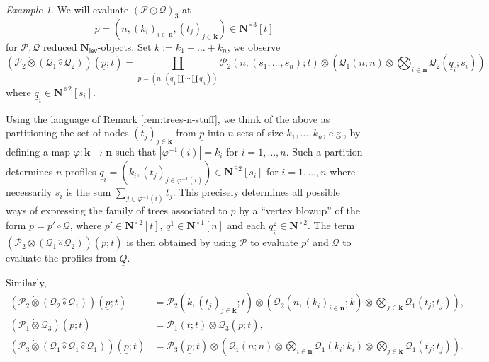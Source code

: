 \documentclass[11pt]{amsart}
\theoremstyle{definition}
\theoremstyle{remark}
\newtheorem{example}[subsection]{Example}
\newcommand{\Cal}[1]{\mathcal{#1}}
\newcommand{\Ncirc}[1]{\mathbf{N}^{\hat{\circ}#1}}
\newcommand{\circhat}{\hat{\circ}}
\newcommand{\circdot}{{\odot}}
\newcommand{\tensordot}{\dot{\otimes}}
\newcommand{\Nl}{\mathbf{N}_{\mathsf{lev}}}
\begin{document}
\begin{example} 
We will evaluate $(\Cal{P}\circdot\Cal{Q})_3$ at \[\underline{p}=(n, (k_i)_{i\in \mathbf{n}}, (t_j)_{j\in \mathbf{k}})\in\Ncirc{3}[t]\] for $\Cal{P}, \Cal{Q}$ reduced $\Nl$-objects. Set $k:=k_1+\dots+k_n$, we observe \[ \left(\Cal{P}_2\tensordot(\Cal{Q}_1\hat{\circ}\Cal{Q}_2) \right)(\underline{p};t)=
\coprod_{\underline{p}=(n,(\underline{q}_1\amalg \cdots \amalg \underline{q}_n))} \Cal{P}_2(n, (s_1,\dots,s_n); t)\otimes \left( \Cal{Q}_1(n;n)\otimes \bigotimes_{i\in\mathbf{n}} \Cal{Q}_2 (\underline{q}_i;s_i)\right)\]
where  $\underline{q}_i\in \Ncirc{2}[s_i]$. 

Using the language of Remark \ref{rem:trees-n-stuff}, we think of the above as partitioning the set of nodes $(t_j)_{j\in\mathbf{k}}$ from $\underline{p}$ into $n$ sets of size $k_1,\dots,k_n$, e.g., by defining a map $\varphi\colon \mathbf{k}\to\mathbf{n}$ such that $|\varphi^{-1}(i)|=k_i$ for $i=1,\dots,n$. Such a partition determines $n$ profiles $\underline{q}_i=(k_i,(t_j)_{j\in\varphi^{-1}(i)}) \in \Ncirc{2}[s_i]$ for $i=1,\dots,n$ where necessarily $s_i$ is the sum $\sum_{j\in \varphi^{-1}(i)} t_j$. This precisely determines all possible ways of expressing the family of trees associated to $\underline{p}$ by a ``vertex blowup'' of the form $\underline{p}=\underline{p}'\circ \Cal{Q}$, where $\underline{p}'\in \Ncirc{2}[t]$, $\underline{q}^1\in \Ncirc{1}[n]$ and each $\underline{q}^2_i\in \Ncirc{2}$. The term $\left(\Cal{P}_2\tensordot(\Cal{Q}_1\hat{\circ}\Cal{Q}_2) \right)(\underline{p};t)$ is then obtained by using $\Cal{P}$ to evaluate $\underline{p}'$ and $\Cal{Q}$ to evaluate the profiles from $\underline{Q}$. %


Similarly, \begin{align*}  
(\Cal{P}_2\tensordot (\Cal{Q}_2 \circhat \Cal{Q}_1))(\underline{p};t) &
=\Cal{P}_2 \left(k, (t_j)_{j\in\mathbf{k}};t\right)\otimes \left( \mathcal{Q}_2(n, (k_i)_{i\in \mathbf{n}}; k) \otimes \bigotimes_{j\in\mathbf{k}} \Cal{Q}_1(t_j;t_j) \right), 
 \\
(\Cal{P}_1\tensordot \Cal{Q}_3)(\underline{p};t) & = \Cal{P}_1(t;t)\otimes \Cal{Q}_3(\underline{p};t),
 \\
(\Cal{P}_3\tensordot(\Cal{Q}_1\circhat\Cal{Q}_1\circhat\Cal{Q}_1))(\underline{p};t) & 
=\Cal{P}_3(\underline{p};t)\otimes \left( \Cal{Q}_1(n;n) \otimes \bigotimes_{i\in\mathbf{n}} \Cal{Q}_1(k_i;k_i) \otimes \bigotimes_{j\in\mathbf{k}} \Cal{Q}_1(t_j;t_j)\right). 
\end{align*}
\end{example}
\end{document}
